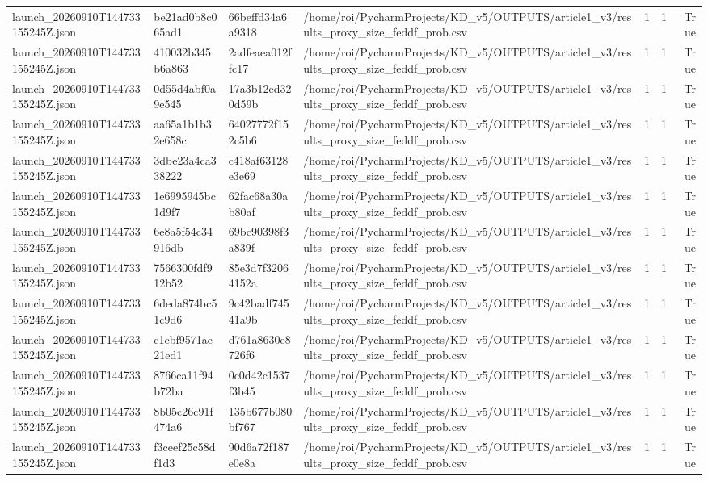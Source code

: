 \begin{tabular}{llllrrr}
launch\_20260910T144733155245Z.json & be21ad0b8c065ad1 & 66beffd34a6a9318 & /home/roi/PycharmProjects/KD\_v5/OUTPUTS/article1\_v3/results\_proxy\_size\_feddf\_prob.csv & 1 & 1 & True \\
launch\_20260910T144733155245Z.json & 410032b345b6a863 & 2adfeaea012ffc17 & /home/roi/PycharmProjects/KD\_v5/OUTPUTS/article1\_v3/results\_proxy\_size\_feddf\_prob.csv & 1 & 1 & True \\
launch\_20260910T144733155245Z.json & 0d55d4abf0a9e545 & 17a3b12ed320d59b & /home/roi/PycharmProjects/KD\_v5/OUTPUTS/article1\_v3/results\_proxy\_size\_feddf\_prob.csv & 1 & 1 & True \\
launch\_20260910T144733155245Z.json & aa65a1b1b32e658c & 64027772f152c5b6 & /home/roi/PycharmProjects/KD\_v5/OUTPUTS/article1\_v3/results\_proxy\_size\_feddf\_prob.csv & 1 & 1 & True \\
launch\_20260910T144733155245Z.json & 3dbe23a4ca338222 & c418af63128e3e69 & /home/roi/PycharmProjects/KD\_v5/OUTPUTS/article1\_v3/results\_proxy\_size\_feddf\_prob.csv & 1 & 1 & True \\
launch\_20260910T144733155245Z.json & 1e6995945bc1d9f7 & 62fac68a30ab80af & /home/roi/PycharmProjects/KD\_v5/OUTPUTS/article1\_v3/results\_proxy\_size\_feddf\_prob.csv & 1 & 1 & True \\
launch\_20260910T144733155245Z.json & 6e8a5f54c34916db & 69bc90398f3a839f & /home/roi/PycharmProjects/KD\_v5/OUTPUTS/article1\_v3/results\_proxy\_size\_feddf\_prob.csv & 1 & 1 & True \\
launch\_20260910T144733155245Z.json & 7566300fdf912b52 & 85e3d7f32064152a & /home/roi/PycharmProjects/KD\_v5/OUTPUTS/article1\_v3/results\_proxy\_size\_feddf\_prob.csv & 1 & 1 & True \\
launch\_20260910T144733155245Z.json & 6deda874bc51c9d6 & 9c42badf74541a9b & /home/roi/PycharmProjects/KD\_v5/OUTPUTS/article1\_v3/results\_proxy\_size\_feddf\_prob.csv & 1 & 1 & True \\
launch\_20260910T144733155245Z.json & c1cbf9571ae21ed1 & d761a8630e8726f6 & /home/roi/PycharmProjects/KD\_v5/OUTPUTS/article1\_v3/results\_proxy\_size\_feddf\_prob.csv & 1 & 1 & True \\
launch\_20260910T144733155245Z.json & 8766ca11f94b72ba & 0c0d42c1537f3b45 & /home/roi/PycharmProjects/KD\_v5/OUTPUTS/article1\_v3/results\_proxy\_size\_feddf\_prob.csv & 1 & 1 & True \\
launch\_20260910T144733155245Z.json & 8b05c26c91f474a6 & 135b677b080bf767 & /home/roi/PycharmProjects/KD\_v5/OUTPUTS/article1\_v3/results\_proxy\_size\_feddf\_prob.csv & 1 & 1 & True \\
launch\_20260910T144733155245Z.json & f3ceef25c58df1d3 & 90d6a72f187e0e8a & /home/roi/PycharmProjects/KD\_v5/OUTPUTS/article1\_v3/results\_proxy\_size\_feddf\_prob.csv & 1 & 1 & True \\
\bottomrule
\end{tabular}

